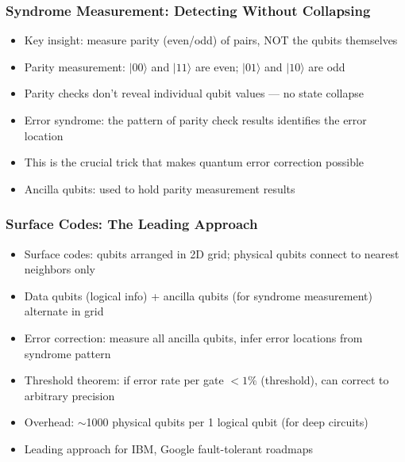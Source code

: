 \begin{frame}[fragile]\frametitle{Syndrome Measurement: Detecting Without Collapsing}
\begin{itemize}
\item Key insight: measure parity (even/odd) of pairs, NOT the qubits themselves
\item Parity measurement: $|00\rangle$ and $|11\rangle$ are even; $|01\rangle$ and $|10\rangle$ are odd
\item Parity checks don't reveal individual qubit values --- no state collapse
\item Error syndrome: the pattern of parity check results identifies the error location
\item This is the crucial trick that makes quantum error correction possible
\item Ancilla qubits: used to hold parity measurement results
\end{itemize}
\end{frame}

\begin{frame}[fragile]\frametitle{Surface Codes: The Leading Approach}
\begin{itemize}
\item Surface codes: qubits arranged in 2D grid; physical qubits connect to nearest neighbors only
\item Data qubits (logical info) + ancilla qubits (for syndrome measurement) alternate in grid
\item Error correction: measure all ancilla qubits, infer error locations from syndrome pattern
\item Threshold theorem: if error rate per gate $< 1\%$ (threshold), can correct to arbitrary precision
\item Overhead: $\sim$1000 physical qubits per 1 logical qubit (for deep circuits)
\item Leading approach for IBM, Google fault-tolerant roadmaps
\end{itemize}
\end{frame}

